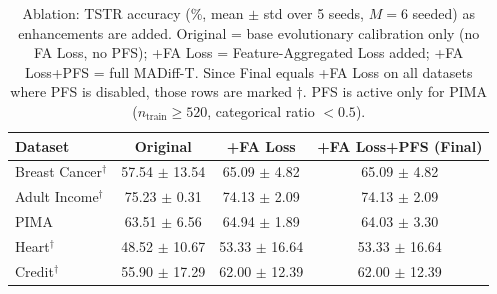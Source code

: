 \begin{table}[!t]
\centering
\caption{Ablation: TSTR accuracy (\%, mean $\pm$ std over 5 seeds,
$M=6$ seeded) as enhancements are added. Original = base evolutionary
calibration only (no FA Loss, no PFS); +FA Loss = Feature-Aggregated
Loss added; +FA Loss+PFS = full MADiff-T. Since Final equals +FA Loss
on all datasets where PFS is disabled, those rows are marked
$\dagger$. PFS is active only for PIMA ($n_{\text{train}} \geq 520$,
categorical ratio $< 0.5$).}
\label{tab:ablation_steps}
\scriptsize
\setlength{\tabcolsep}{4pt}
\renewcommand{\arraystretch}{1.15}
\begin{tabular}{l|c|c|c}
\rowcolor{gray!20}
\textbf{Dataset} & \textbf{Original} & \textbf{+FA Loss} & \textbf{+FA Loss+PFS (Final)} \\
\hline
Breast Cancer$^\dagger$ & 57.54 $\pm$ 13.54 & 65.09 $\pm$ 4.82 & 65.09 $\pm$ 4.82 \\
Adult Income$^\dagger$ & 75.23 $\pm$ 0.31 & 74.13 $\pm$ 2.09 & 74.13 $\pm$ 2.09 \\
PIMA & 63.51 $\pm$ 6.56 & 64.94 $\pm$ 1.89 & 64.03 $\pm$ 3.30 \\
Heart$^\dagger$ & 48.52 $\pm$ 10.67 & 53.33 $\pm$ 16.64 & 53.33 $\pm$ 16.64 \\
Credit$^\dagger$ & 55.90 $\pm$ 17.29 & 62.00 $\pm$ 12.39 & 62.00 $\pm$ 12.39 \\
\end{tabular}
\end{table}
